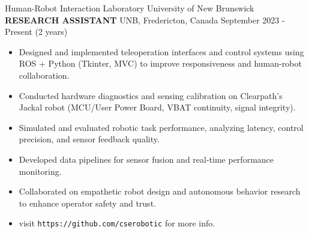 

\begin{cventries}
    \cventry
    {Human-Robot Interaction Laboratory \textemdash University of New Brunswick}
    {\textbf{RESEARCH ASSISTANT}}
    {UNB, Fredericton, Canada}
    {September 2023 - Present (2 years)}
    {
        \vspace{0.2 cm}
        \begin{itemize}
            \item Designed and implemented teleoperation interfaces and control systems using ROS + Python (Tkinter, MVC) to improve responsiveness and human-robot collaboration.
            \item Conducted hardware diagnostics and sensing calibration on Clearpath’s Jackal robot (MCU/User Power Board, VBAT continuity, signal integrity).
            \item Simulated and evaluated robotic task performance, analyzing latency, control precision, and sensor feedback quality.
            \item Developed data pipelines for sensor fusion and real-time performance monitoring.
            \item Collaborated on empathetic robot design and autonomous behavior research to enhance operator safety and trust.
            \item visit \texttt{https://github.com/cserobotic} for more info.
        \end{itemize}
    }
\end{cventries}
